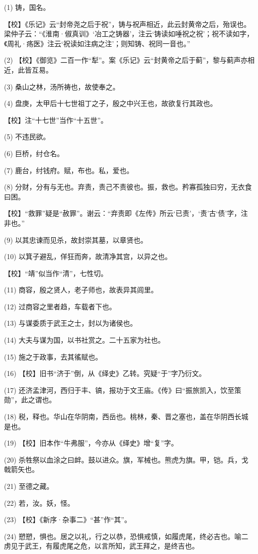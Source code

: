 \documentclass[12pt,UTF8]{ctexbook}
\begin{document}
(1) 铸，国名。

【校】《乐记》云“封帝尧之后于祝”，铸与祝声相近，此云封黄帝之后，殆误也。梁仲子云：“《淮南·俶真训》‘冶工之铸器’，注云‘铸读如唾祝之祝’；祝不读如字，《周礼·疡医》注云‘祝读如注病之注’；则知铸、祝同一音也。”

(2) 【校】《御览》二百一作“犁”。案《乐记》云“封黄帝之后于蓟”，黎与蓟声亦相近，此皆互易。

(3) 桑山之林，汤所祷也，故使奉之。

(4) 盘庚，太甲后十七世祖丁之子，殷之中兴王也，故欲复行其政也。

【校】注“十七世”当作“十五世”。

(5) 不违民欲。

(6) 巨桥，纣仓名。

(7) 鹿台，纣钱府。赋，布也。私，爱也。

(8) 分财，分有与无也。弃责，责己不责彼也。振，救也。矜寡孤独曰穷，无衣食曰困。

【校】“救罪”疑是“赦罪”。谢云：“弃责即《左传》所云‘已责’，‘责’古‘债’字，注非也。”

(9) 以其忠谏而见杀，故封崇其墓，以章贤也。

(10) 以箕子避乱，佯狂而奔，故清净其宫，以异之也。

【校】“靖”似当作“清”，七性切。

(11) 商容，殷之贤人，老子师也，故表异其闾里。

(12) 过商容之里者趋，车载者下也。

(13) 与谋委质于武王之士，封以为诸侯也。

(14) 大夫与谋为国，以书社赏之。二十五家为社也。

(15) 施之于政事，去其徭赋也。

(16) 【校】旧书“济于”倒，从《绎史》乙转。究疑“于”字乃衍文。

(17) 还济孟津河，西归于丰、镐，报功于文王庙。《传》曰“振旅凯入，饮至策勋”，此之谓也。

(18) 税，释也。华山在华阴南，西岳也。桃林，秦、晋之塞也，盖在华阴西长城是也。

(19) 【校】旧本作“牛弗服”，今亦从《绎史》增“复”字。

(20) 杀牲祭以血涂之曰衅。鼓以进众。旗，军械也。熊虎为旗。甲，铠。兵，戈戟箭矢也。

(21) 至德之藏。

(22) 若，汝。妖，怪。

(23) 【校】《新序·杂事二》“甚”作“其”。

(24) 愬愬，惧也。居之以礼，行之以恭，恐惧戒慎，如履虎尾，终必吉也。喻二虏见于武王，有履虎尾之危，以言所知，武王拜之，是终吉也。
\end{document}
